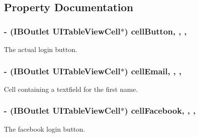 \subsection{Property Documentation}
\hypertarget{interface_e_s_login_view_controller_a446ed3f533c39cdb63241e06a765f3e8}{}
\subsubsection[{cell\+Button}]{\setlength{\rightskip}{0pt plus 5cm}-\/ (I\+B\+Outlet U\+I\+Table\+View\+Cell$\ast$) cell\+Button\hspace{0.3cm}{\ttfamily [read]}, {\ttfamily [write]}, {\ttfamily [nonatomic]}, {\ttfamily [strong]}}\label{interface_e_s_login_view_controller_a446ed3f533c39cdb63241e06a765f3e8}
The actual login button. \hypertarget{interface_e_s_login_view_controller_a691b4e1f4b0734b46af9294fa1ee66b7}{}
\subsubsection[{cell\+Email}]{\setlength{\rightskip}{0pt plus 5cm}-\/ (I\+B\+Outlet U\+I\+Table\+View\+Cell$\ast$) cell\+Email\hspace{0.3cm}{\ttfamily [read]}, {\ttfamily [write]}, {\ttfamily [nonatomic]}, {\ttfamily [strong]}}\label{interface_e_s_login_view_controller_a691b4e1f4b0734b46af9294fa1ee66b7}
Cell containing a textfield for the first name. \hypertarget{interface_e_s_login_view_controller_a9c4f81d25aa56e73c79f136f98507866}{}
\subsubsection[{cell\+Facebook}]{\setlength{\rightskip}{0pt plus 5cm}-\/ (I\+B\+Outlet U\+I\+Table\+View\+Cell$\ast$) cell\+Facebook\hspace{0.3cm}{\ttfamily [read]}, {\ttfamily [write]}, {\ttfamily [nonatomic]}, {\ttfamily [strong]}}\label{interface_e_s_login_view_controller_a9c4f81d25aa56e73c79f136f98507866}
The facebook login button. \hypertarget{interface_e_s_login_view_controller_a17fc8e4a369db0b8b6f10dbe149dd5be}{}
